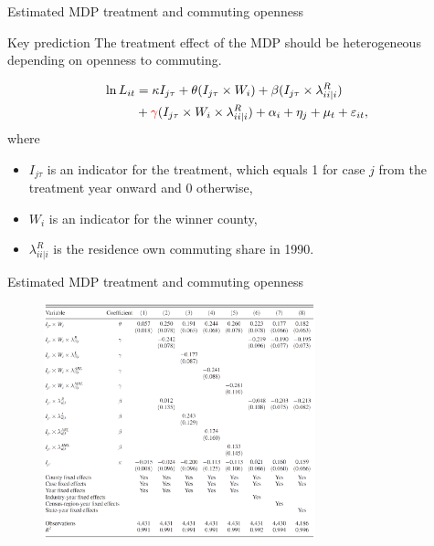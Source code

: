\documentclass{beamer}
\begin{document}
\begin{frame}{Estimated MDP treatment and commuting openness}
	\begin{block}{Key prediction}
		The treatment effect of the MDP should be heterogeneous depending on openness to commuting.
	\end{block}
	\begin{equation}
		\begin{aligned}
			\ln L_{it} &= \kappa I_{j\tau} + \theta(I_{j\tau}\times W_i) + \beta(I_{j\tau}\times \lambda_{ii|i}^R) \\
			&+ \textcolor{red}{\gamma}(I_{j\tau}\times W_i\times \lambda_{ii|i}^R) + \alpha_i + \eta_j + \mu_t + \varepsilon_{it},
		\end{aligned}
	\end{equation}
	where
	\begin{itemize}
		\item $I_{j\tau}$ is an indicator for the treatment, which equals 1 for case $j$ from the treatment year onward and 0 otherwise,
		\item $W_i$ is an indicator for the winner county,
		\item $\lambda_{ii|i}^R$ is the residence own commuting share in 1990.
	\end{itemize}
\end{frame}
\begin{frame}{Estimated MDP treatment and commuting openness}
	\begin{figure}[htbp]
		\centering
		\includegraphics[width=0.7\textwidth]{tab3.png}
	\end{figure}
\end{frame}
\end{document}
